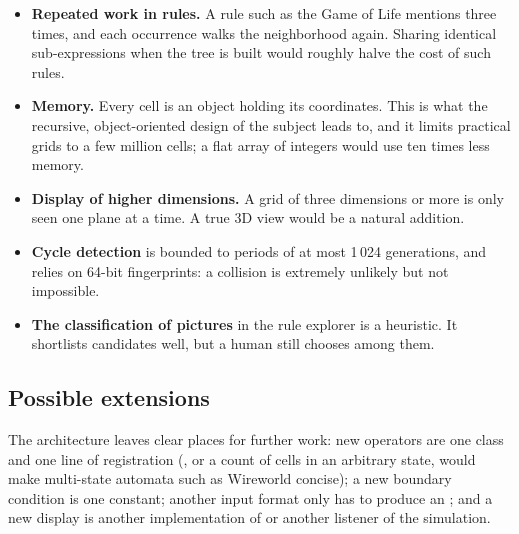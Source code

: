 \begin{itemize}
    \item \textbf{Repeated work in rules.} A rule such as the Game of Life mentions
           three times, and each occurrence walks the neighborhood again. Sharing
          identical sub-expressions when the tree is built would roughly halve the cost of such rules.
    \item \textbf{Memory.} Every cell is an object holding its coordinates. This is what the
          recursive, object-oriented design of the subject leads to, and it limits practical grids to
          a few million cells; a flat array of integers would use ten times less memory.
    \item \textbf{Display of higher dimensions.} A grid of three dimensions or more is only seen
          one plane at a time. A true 3D view would be a natural addition.
    \item \textbf{Cycle detection} is bounded to periods of at most 1\,024 generations, and relies
          on 64-bit fingerprints: a collision is extremely unlikely but not impossible.
    \item \textbf{The classification of pictures} in the rule explorer is a heuristic. It
          shortlists candidates well, but a human still chooses among them.
\end{itemize}

\subsection{Possible extensions}

The architecture leaves clear places for further work: new operators are one class and one line
of registration (, or a count of cells in an arbitrary state, would make multi-state
automata such as Wireworld concise); a new boundary condition is one constant; another input
format only has to produce an ; and a new display is another
implementation of  or another listener of the simulation.
